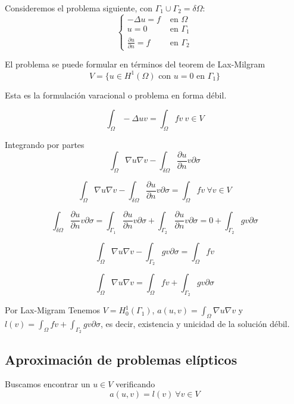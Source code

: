 	\begin{example}
		Consideremos el problema siguiente, con $\Gamma_1 \cup \Gamma_2 = \delta \Omega$:		
		\begin{equation*}
			\left\{
			\begin{matrix}
				-\Delta u = f & \text{ en } \Omega\\
				u = 0 & \text{ en } \Gamma_1\\
				\frac{\partial u}{\partial n} = f & \text{ en } \Gamma_2
			\end{matrix}
			\right.
		\end{equation*}
		
		El problema se puede formular en términos del teorem de Lax-Milgram 
		$$V = \{u\in H^1(\Omega) \text{ con } u = 0 \text{ en } \Gamma_1 \}$$
		
		Esta es la formulación varacional o problema en forma débil.
		
		$$\int_\Omega -\Delta uv = \int_\Omega fv \ v\in V$$
		
		Integrando por partes
		$$\int_\Omega \nabla u\nabla v - \int _{\delta \Omega}\frac{\partial u}{\partial n} v \partial \sigma$$
		
		$$\int_\Omega \nabla u\nabla v - \int _{\delta \Omega}\frac{\partial u}{\partial n} v \partial \sigma = \int _\Omega fv \ \forall v \in V$$
		
		$$\int _{\delta \Omega}\frac{\partial u}{\partial n} v \partial \sigma 
		= 
		\int _{\Gamma_1}\frac{\partial u}{\partial n} v \partial \sigma
		+
		\int _{\Gamma_2}\frac{\partial u}{\partial n} v \partial \sigma
		= 
		0+\int_{\Gamma_2} gv\partial\sigma$$
		
		$$\int_\Omega \nabla u\nabla v - \int _{\Gamma_2}g v \partial \sigma = \int _\Omega fv$$
		
		$$\int_\Omega \nabla u\nabla v  = \int _\Omega fv + \int _{\Gamma_2}g v \partial \sigma$$
		
		Por Lax-Migram 
		Tenemos $V = H_0^1(\Gamma_1)$,  $a(u,v) = \int_{\Omega}\nabla u\nabla v$ y $l(v) = \int _\Omega fv + \int _{\Gamma_2} gv\partial \sigma$, es decir, existencia y unicidad de la solución débil.
	\end{example}


    \subsection{Aproximación de problemas elípticos}
    Buscamos encontrar un $u\in V$ verificando
    $$a(u,v) = l(v) \ \forall v\in V$$
    

